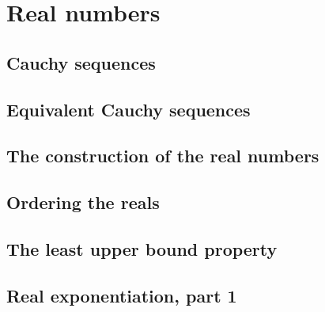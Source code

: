 \documentclass[12pt]{article}
\theoremstyle{definition}
\theoremstyle{remark}
\begin{document}
\section{Real numbers}
\subsection{Cauchy sequences}
\subsection{Equivalent Cauchy sequences}
\subsection{The construction of the real numbers}
\subsection{Ordering the reals}
\subsection{The least upper bound property}
\subsection{Real exponentiation, part 1}
\end{document}
